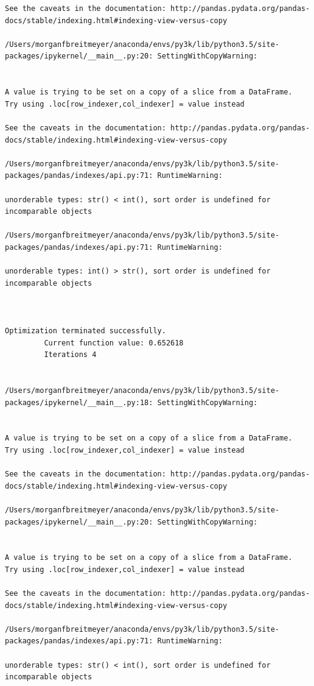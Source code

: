 \begin{lstlisting}
See the caveats in the documentation: http://pandas.pydata.org/pandas-docs/stable/indexing.html#indexing-view-versus-copy

/Users/morganfbreitmeyer/anaconda/envs/py3k/lib/python3.5/site-packages/ipykernel/__main__.py:20: SettingWithCopyWarning:


A value is trying to be set on a copy of a slice from a DataFrame.
Try using .loc[row_indexer,col_indexer] = value instead

See the caveats in the documentation: http://pandas.pydata.org/pandas-docs/stable/indexing.html#indexing-view-versus-copy

/Users/morganfbreitmeyer/anaconda/envs/py3k/lib/python3.5/site-packages/pandas/indexes/api.py:71: RuntimeWarning:

unorderable types: str() < int(), sort order is undefined for incomparable objects

/Users/morganfbreitmeyer/anaconda/envs/py3k/lib/python3.5/site-packages/pandas/indexes/api.py:71: RuntimeWarning:

unorderable types: int() > str(), sort order is undefined for incomparable objects



Optimization terminated successfully.
         Current function value: 0.652618
         Iterations 4


/Users/morganfbreitmeyer/anaconda/envs/py3k/lib/python3.5/site-packages/ipykernel/__main__.py:18: SettingWithCopyWarning:


A value is trying to be set on a copy of a slice from a DataFrame.
Try using .loc[row_indexer,col_indexer] = value instead

See the caveats in the documentation: http://pandas.pydata.org/pandas-docs/stable/indexing.html#indexing-view-versus-copy

/Users/morganfbreitmeyer/anaconda/envs/py3k/lib/python3.5/site-packages/ipykernel/__main__.py:20: SettingWithCopyWarning:


A value is trying to be set on a copy of a slice from a DataFrame.
Try using .loc[row_indexer,col_indexer] = value instead

See the caveats in the documentation: http://pandas.pydata.org/pandas-docs/stable/indexing.html#indexing-view-versus-copy

/Users/morganfbreitmeyer/anaconda/envs/py3k/lib/python3.5/site-packages/pandas/indexes/api.py:71: RuntimeWarning:

unorderable types: str() < int(), sort order is undefined for incomparable objects


\end{lstlisting}
